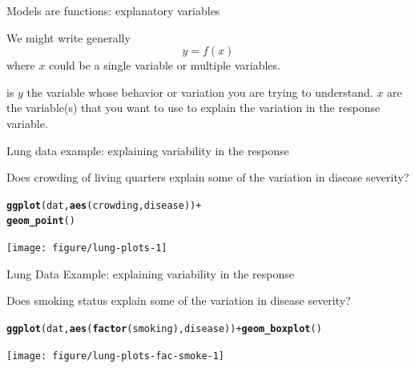 \documentclass[table]{beamer}\usepackage[]{graphicx}\usepackage[]{color}
\makeatletter
\newcommand{\hlopt}[1]{\textcolor[rgb]{0,0,0}{#1}}%
\newcommand{\hlstd}[1]{\textcolor[rgb]{0.345,0.345,0.345}{#1}}%
\newcommand{\hlkwd}[1]{\textcolor[rgb]{0.737,0.353,0.396}{\textbf{#1}}}%
\newenvironment{kframe}{%
 \def\at@end@of@kframe{}%
 \ifinner\ifhmode%
  \def\at@end@of@kframe{\end{minipage}}%
  \begin{minipage}{\columnwidth}%
 \fi\fi%
 \def\FrameCommand##1{\hskip\@totalleftmargin \hskip-\fboxsep
 \colorbox{shadecolor}{##1}\hskip-\fboxsep
     \hskip-\linewidth \hskip-\@totalleftmargin \hskip\columnwidth}%
 \MakeFramed {\advance\hsize-\width
   \@totalleftmargin\z@ \linewidth\hsize
   \@setminipage}}%
 {\par\unskip\endMakeFramed%
 \at@end@of@kframe}
\newenvironment{knitrout}{}{} %
\makeatother
\begin{document}

\begin{frame}[fragile]{Models are functions: explanatory variables}

We might write generally $$ y = f(x)$$ where $x$ could be a single variable or multiple variables.

\bi
   is $y$ the variable whose behavior or variation you are trying to understand. 
   $x$ are the variable(s) that you want to use to explain the variation in the response variable.
\ei

\end{frame}


\begin{frame}[fragile]{Lung data example: explaining variability in the response}

Does crowding of living quarters explain some of the variation in disease severity?


\begin{knitrout}\footnotesize
{}\color{fgcolor}\begin{kframe}
\begin{alltt}
\hlkwd{ggplot}\hlstd{(dat,} \hlkwd{aes}\hlstd{(crowding, disease))} \hlopt{+}
  \hlkwd{geom_point}\hlstd{()}
\end{alltt}
\end{kframe}
\texttt{[image: figure/lung-plots-1]} 

\end{knitrout}


\end{frame}


\begin{frame}[fragile]{Lung Data Example: explaining variability in the response}

Does smoking status explain some of the variation in disease severity?

\begin{knitrout}\footnotesize
{}\color{fgcolor}\begin{kframe}
\begin{alltt}
\hlkwd{ggplot}\hlstd{(dat,} \hlkwd{aes}\hlstd{(}\hlkwd{factor}\hlstd{(smoking), disease))} \hlopt{+} \hlkwd{geom_boxplot}\hlstd{()}
\end{alltt}
\end{kframe}
\texttt{[image: figure/lung-plots-fac-smoke-1]} 

\end{knitrout}


\end{frame}
\end{document}
